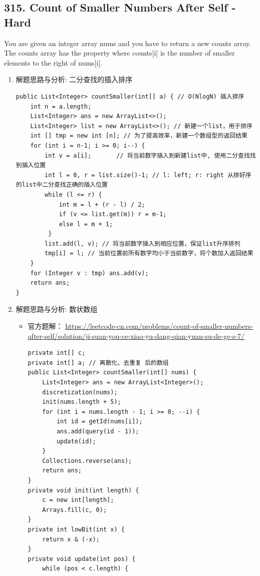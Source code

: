 \documentclass[9pt, b5paaper]{book}
\begin{document}
\subsection{315. Count of Smaller Numbers After Self - Hard}
\label{sec-1-1-4}
You are given an integer array nums and you have to return a new counts array. The counts array has the property where counts[i] is the number of smaller elements to the right of nums[i].
\begin{enumerate}
\item 解题思路与分析: 二分查找的插入排序
\label{sec-1-1-4-1}
\begin{verbatim}
public List<Integer> countSmaller(int[] a) { // O(NlogN) 插入排序
    int n = a.length;
    List<Integer> ans = new ArrayList<>();
    List<Integer> list = new ArrayList<>(); // 新建一个list，用于排序
    int [] tmp = new int [n]; // 为了提高效率，新建一个数组型的返回结果
    for (int i = n-1; i >= 0; i--) {
        int v = a[i];       // 将当前数字插入到新建list中, 使用二分查找找到插入位置
        int l = 0, r = list.size()-1; // l: left; r: right 从排好序的list中二分查找正确的插入位置
        while (l <= r) {
            int m = l + (r - l) / 2;
            if (v <= list.get(m)) r = m-1;
            else l = m + 1;
         }
        list.add(l, v); // 将当前数字插入到相应位置，保证list升序排列
        tmp[i] = l; // 当前位置前所有数字均小于当前数字，将个数加入返回结果
    }
    for (Integer v : tmp) ans.add(v);
    return ans;
}
\end{verbatim}
\item 解题思路与分析: 数状数组
\label{sec-1-1-4-2}
\begin{itemize}
\item 官方题解： \url{https://leetcode-cn.com/problems/count-of-smaller-numbers-after-self/solution/ji-suan-you-ce-xiao-yu-dang-qian-yuan-su-de-ge-s-7/}
\begin{verbatim}
private int[] c;
private int[] a; // 离散化、去重复 后的数组
public List<Integer> countSmaller(int[] nums) {
    List<Integer> ans = new ArrayList<Integer>(); 
    discretization(nums);
    init(nums.length + 5);
    for (int i = nums.length - 1; i >= 0; --i) {
        int id = getId(nums[i]);
        ans.add(query(id - 1));
        update(id);
    }
    Collections.reverse(ans);
    return ans;
}
private void init(int length) {
    c = new int[length];
    Arrays.fill(c, 0);
}
private int lowBit(int x) {
    return x & (-x);
}
private void update(int pos) {
    while (pos < c.length) {

\end{verbatim}
\end{itemize}
\end{enumerate}
\end{document}
